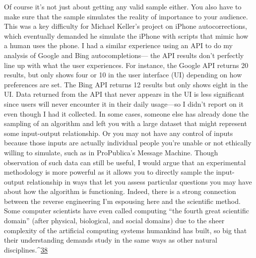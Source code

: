 Of course it's not just about getting any valid sample either. You also have to make sure that the sample simulates the reality of importance to your audience. This was a key difficulty for Michael Keller's project on iPhone autocorrections, which eventually demanded he simulate the iPhone with scripts that mimic how a human uses the phone. I had a similar experience using an API to do my analysis of Google and Bing autocompletions— the API results don't perfectly line up with what the user experiences. For instance, the Google API returns 20 results, but only shows four or 10 in the user interface (UI) depending on how preferences are set. The Bing API returns 12 results but only shows eight in the UI. Data returned from the API that never appears in the UI is less significant since users will never encounter it in their daily usage—so I didn't report on it even though I had it collected. 
In some cases, someone else has already done the sampling of an algorithm and left you with a large dataset that might represent some input-output relationship. Or you may not have any control of inputs because those inputs are actually individual people you're unable or not ethically willing to simulate, such as in ProPublica's Message Machine. Though observation of such data can still be useful, I would argue that an experimental methodology is more powerful as it allows you to directly sample the input-output relationship in ways that let you assess particular questions you may have about how the algorithm is functioning. Indeed, there is a strong connection between the reverse engineering I'm espousing here and the scientific method. Some computer scientists have even called computing ``the fourth great scientific domain'' (after physical, biological, and social domains) due to the sheer complexity of the artificial computing systems humankind has built, so big that their understanding demands study in the same ways as other natural disciplines.^{\href{#endnotes}{38}}
